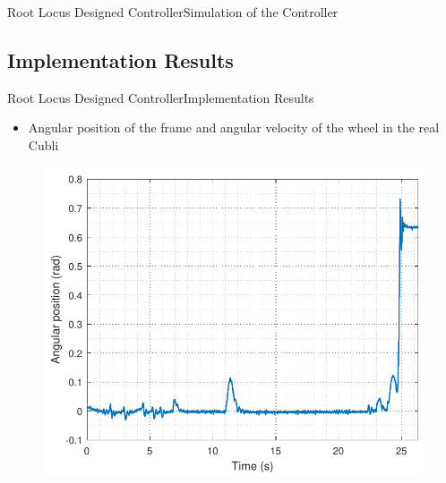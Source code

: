 \begin{frame}{Root Locus Designed Controller}{Simulation of the Controller}
\begin{minipage}{\linewidth}
\begin{minipage}{0.45\linewidth}
\begin{figure}[H]
			\centering
		\end{figure}
	\end{minipage}
\end{minipage}
\end{frame}

\subsection{Implementation Results}

\begin{frame}{Root Locus Designed Controller}{Implementation Results}	
\begin{itemize}
	\item Angular position of the frame and angular velocity of the wheel in the real Cubli
\end{itemize}
\begin{minipage}{\linewidth}
	\begin{minipage}{0.4\linewidth}
		\begin{figure}
			\includegraphics[scale=.35]{Pictures/positionRLTest}
			\centering
		\end{figure}
	\end{minipage}
	\hspace{0.1\linewidth}
	\begin{minipage}{0.45\linewidth}
		\begin{figure}[H]

\end{figure}
\end{minipage}
\end{minipage}
\end{frame}
